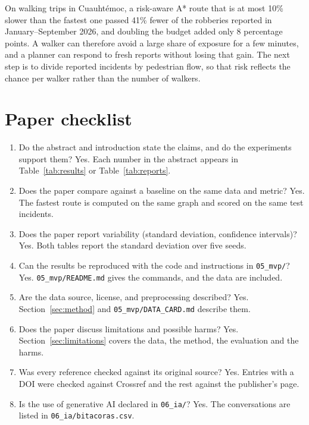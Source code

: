 \documentclass{article}
\begin{document}
On walking trips in Cuauhtémoc, a risk-aware A* route that is at most 10\% slower than the
fastest one passed 41\% fewer of the robberies reported in January--September 2026, and doubling
the budget added only 8 percentage points. A walker can therefore avoid a large share of exposure
for a few minutes, and a planner can respond to fresh reports without losing that gain. The next
step is to divide reported incidents by pedestrian flow, so that risk reflects the chance per
walker rather than the number of walkers.




\appendix
\section*{Paper checklist}
\begin{enumerate}
  \item Do the abstract and introduction state the claims, and do the experiments support them?
        Yes. Each number in the abstract appears in Table~\ref{tab:results} or
        Table~\ref{tab:reports}.
  \item Does the paper compare against a baseline on the same data and metric?
        Yes. The fastest route is computed on the same graph and scored on the same test incidents.
  \item Does the paper report variability (standard deviation, confidence intervals)?
        Yes. Both tables report the standard deviation over five seeds.
  \item Can the results be reproduced with the code and instructions in \texttt{05\_mvp/}?
        Yes. \texttt{05\_mvp/README.md} gives the commands, and the data are included.
  \item Are the data source, license, and preprocessing described?
        Yes. Section~\ref{sec:method} and \texttt{05\_mvp/DATA\_CARD.md} describe them.
  \item Does the paper discuss limitations and possible harms?
        Yes. Section~\ref{sec:limitations} covers the data, the method, the evaluation and the harms.
  \item Was every reference checked against its original source?
        Yes. Entries with a DOI were checked against Crossref and the rest against the publisher's page.
  \item Is the use of generative AI declared in \texttt{06\_ia/}?
        Yes. The conversations are listed in \texttt{06\_ia/bitacoras.csv}.
\end{enumerate}
\end{document}
